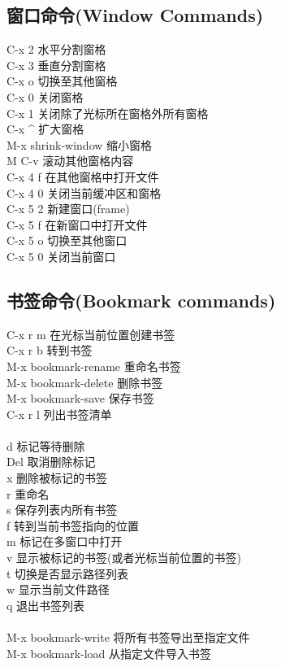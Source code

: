 \documentclass[11pt,a4paper,titlepage]{article}
\begin{document}
{\subsection{\kai 窗口命令(Window Commands)}
C-x 2 水平分割窗格\\
C-x 3 垂直分割窗格\\
C-x o 切换至其他窗格\\
C-x 0 关闭窗格\\
C-x 1 关闭除了光标所在窗格外所有窗格\\
C-x \^{} 扩大窗格\\
M-x shrink-window 缩小窗格\\
M C-v 滚动其他窗格内容\\
C-x 4 f 在其他窗格中打开文件\\
C-x 4 0 关闭当前缓冲区和窗格\\
C-x 5 2 新建窗口(frame)\\
C-x 5 f 在新窗口中打开文件\\
C-x 5 o 切换至其他窗口\\
C-x 5 0 关闭当前窗口\\

\subsection{\kai 书签命令(Bookmark commands)}
C-x r m 在光标当前位置创建书签\\
C-x r b 转到书签\\
M-x bookmark-rename 重命名书签\\
M-x bookmark-delete 删除书签\\
M-x bookmark-save 保存书签\\
C-x r l 列出书签清单\\
  \\
d 标记等待删除\\
Del 取消删除标记\\
x 删除被标记的书签\\
r 重命名\\
s 保存列表内所有书签\\
f 转到当前书签指向的位置\\
m 标记在多窗口中打开\\
v 显示被标记的书签(或者光标当前位置的书签)\\
t 切换是否显示路径列表\\
w 显示当前文件路径\\
q 退出书签列表\\
  \\
M-x bookmark-write 将所有书签导出至指定文件\\
M-x bookmark-load 从指定文件导入书签\\

}
\end{document}
